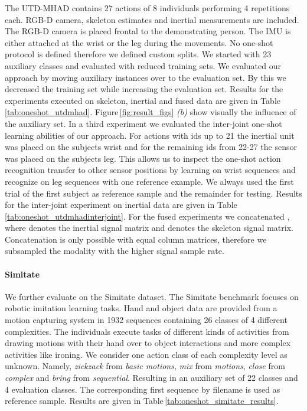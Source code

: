 \documentclass[10pt,conference,a4paper]{IEEEtran}
\def\fignamelong{Figure\,}
\def\tabname{Table\,}
\begin{document}
The UTD-MHAD \cite{chen2015utd} contains 27 actions of 8 individuals performing 4 repetitions each. RGB-D camera, skeleton estimates and inertial measurements are included.
The RGB-D camera is placed frontal to the demonstrating person. The IMU is either attached at the wrist or the leg during the movements. No one-shot protocol is defined therefore we defined custom splits. We started with 23 auxiliary classes and evaluated with reduced training sets. We evaluated our approach by moving auxiliary instances over to the evaluation set. By this we decreased the training set while increasing the evaluation set.
Results for the experiments executed on skeleton, inertial and fused data are given in \tabname \ref{tab:oneshot_utdmhad}. \fignamelong \ref{fig:result_figs} \textit{(b)} show visually the influence of the auxiliary set.
In a third experiment we evaluated the inter-joint one-shot learning abilities of our approach. For actions with ids up to 21 the inertial unit was placed on the subjects wrist and for the remaining ids from 22-27 the sensor was placed on the subjects leg. This allows us to inspect the one-shot action recognition transfer to other sensor positions by learning on wrist sequences and recognize on leg sequences with one reference example.
We always used the first trial of the first subject as reference sample and the remainder for testing.
Results for the inter-joint experiment on inertial data are given in \tabname \ref{tab:oneshot_utdmhadinterjoint}. For the fused experiments we concatenated
, where  denotes the inertial signal matrix and  denotes the skeleton signal matrix. Concatenation is only possible with equal column matrices, therefore we subsampled the modality with the higher signal sample rate.

\paragraph{Simitate}

We further evaluate on the Simitate dataset. The Simitate benchmark focuses on robotic imitation learning tasks. Hand and object data are provided from a motion capturing system in 1932 sequences containing 26 classes of 4 different complexities. The individuals execute tasks of different kinds of activities from drawing motions with their hand over to object interactions and more complex activities like ironing. 
We consider one action class of each complexity level as unknown. Namely, \textit{zickzack} from \textit{basic motions}, \textit{mix} from \textit{motions}, \textit{close} from \textit{complex} and \textit{bring} from \textit{sequential}. Resulting in an auxiliary set of 22 classes and 4 evaluation classes. The corresponding first sequence by filename is used as reference sample. Results are given in \tabname \ref{tab:oneshot_simitate_results}.
\end{document}
